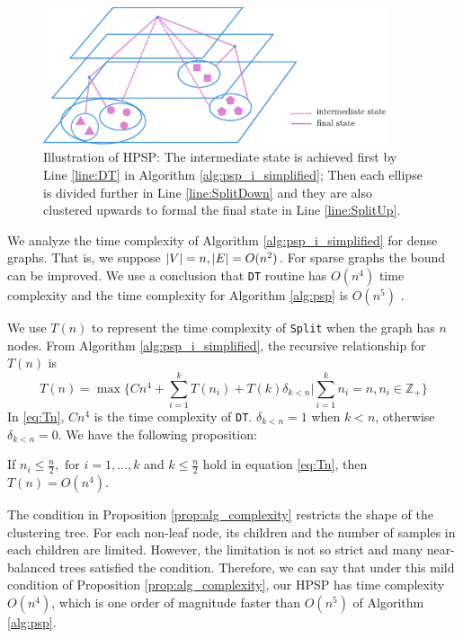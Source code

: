 \begin{figure}
\centering
\includegraphics[width=0.9\textwidth]{improved_alg.eps}
\caption{Illustration of HPSP: The intermediate state is achieved first by Line \ref{line:DT} in Algorithm \ref{alg:psp_i_simplified};
Then each ellipse is divided further in Line \ref{line:SplitDown} and they are also clustered upwards to formal the final state in Line \ref{line:SplitUp}.}\label{fig:HPSP}
\end{figure}

We analyze the time complexity of Algorithm \ref{alg:psp_i_simplified} for dense graphs. That is, we suppose $\lvert V\rvert = n, \lvert E\rvert = O(n^2)$. For sparse graphs the bound can be improved. We use a conclusion that \texttt{DT} routine has $O(n^4)$ time complexity and the time complexity for Algorithm \ref{alg:psp} is $O(n^5)$ \citep{pin}.

We use $T(n)$ to represent the time complexity of \texttt{Split} when the graph has $n$ nodes.
From Algorithm \ref{alg:psp_i_simplified}, the recursive relationship for $T(n)$ is
\begin{equation}\label{eq:Tn}
T(n) = \max \{ C n^4 + \sum_{i=1}^k T(n_i) + T(k)\delta_{k<n} | \sum_{i=1}^k n_i = n, n_i \in \mathbb{Z}_{+} \}
\end{equation}	
In \eqref{eq:Tn}, $Cn^4$ is the time complexity of \texttt{DT}. $\delta_{k<n} = 1$ when $k<n$, otherwise $\delta_{k<n}=0$. We have the following proposition:
\begin{proposition}\label{prop:alg_complexity}
	 If $n_i \leq \frac{n}{2}, \textrm{ for } i=1,\dots,k$ and $ k \leq \frac{n}{2}$  hold in equation \eqref{eq:Tn}, then $T(n) = O(n^4)$.
\end{proposition}

The condition in Proposition \ref{prop:alg_complexity} restricts the shape of the clustering tree. For each non-leaf node, its children and the number of samples in each children are limited. However, the limitation is not so strict and
many near-balanced trees satisfied the condition. Therefore, we can say that under this mild condition of Proposition \ref{prop:alg_complexity},
our HPSP has time complexity $O(n^4)$, which is one order of magnitude faster than $O(n^5)$ of Algorithm \ref{alg:psp}.

